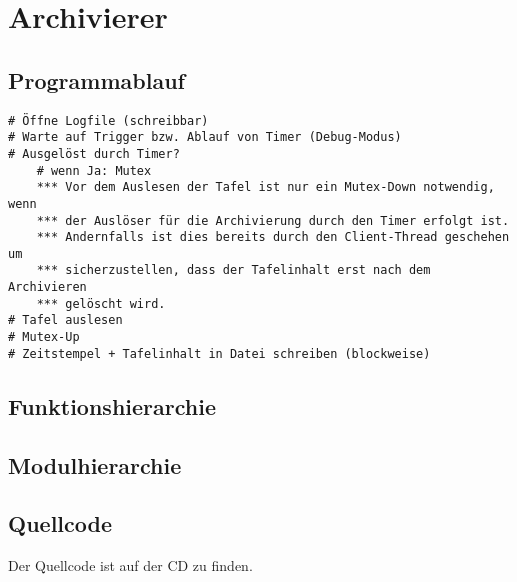 \section{Archivierer}

\subsection{Programmablauf}
\begin{lstlisting}
# Öffne Logfile (schreibbar)
# Warte auf Trigger bzw. Ablauf von Timer (Debug-Modus)
# Ausgelöst durch Timer?
    # wenn Ja: Mutex
    *** Vor dem Auslesen der Tafel ist nur ein Mutex-Down notwendig, wenn
    *** der Auslöser für die Archivierung durch den Timer erfolgt ist.
    *** Andernfalls ist dies bereits durch den Client-Thread geschehen um
    *** sicherzustellen, dass der Tafelinhalt erst nach dem Archivieren
    *** gelöscht wird.
# Tafel auslesen
# Mutex-Up
# Zeitstempel + Tafelinhalt in Datei schreiben (blockweise)
\end{lstlisting}

\subsection{Funktionshierarchie}

\subsection{Modulhierarchie}

\subsection{Quellcode}
Der Quellcode ist auf der CD zu finden.